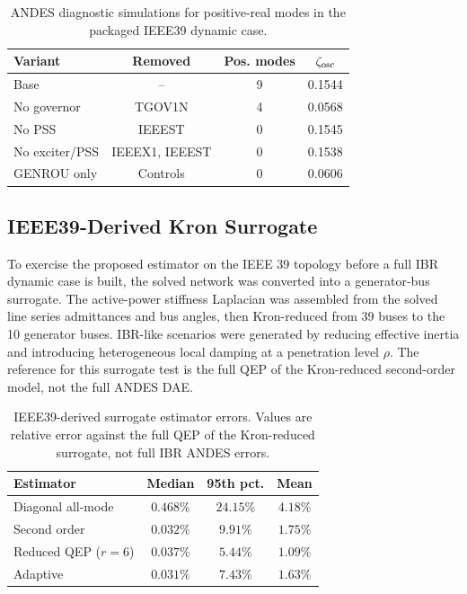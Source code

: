 \documentclass[journal]{IEEEtran}
\begin{document}
\begin{table}[t]
\centering
\caption{ANDES diagnostic simulations for positive-real modes in the packaged IEEE39 dynamic case.}
\label{tab:andesdiagnostic}
\begin{tabular}{lccc}
\toprule
Variant & Removed & Pos. modes & $\zeta_{\rm osc}$\\
\midrule
Base & -- & 9 & 0.1544\\
No governor & TGOV1N & 4 & 0.0568\\
No PSS & IEEEST & 0 & 0.1545\\
No exciter/PSS & IEEEX1, IEEEST & 0 & 0.1538\\
GENROU only & Controls & 0 & 0.0606\\
\bottomrule
\end{tabular}
\end{table}

\subsection{IEEE39-Derived Kron Surrogate}

To exercise the proposed estimator on the IEEE 39 topology before a full IBR dynamic case is built, the solved network was converted into a generator-bus surrogate. The active-power stiffness Laplacian was assembled from the solved line series admittances and bus angles, then Kron-reduced from 39 buses to the 10 generator buses. IBR-like scenarios were generated by reducing effective inertia and introducing heterogeneous local damping at a penetration level $\rho$. The reference for this surrogate test is the full QEP of the Kron-reduced second-order model, not the full ANDES DAE.

\begin{table}[t]
\centering
\caption{IEEE39-derived surrogate estimator errors. Values are relative error against the full QEP of the Kron-reduced surrogate, not full IBR ANDES errors.}
\label{tab:ieee39surrogate}
\begin{tabular}{lccc}
\toprule
Estimator & Median & 95th pct. & Mean\\
\midrule
Diagonal all-mode & $0.468\%$ & $24.15\%$ & $4.18\%$\\
Second order & $0.032\%$ & $9.91\%$ & $1.75\%$\\
Reduced QEP ($r=6$) & $0.037\%$ & $5.44\%$ & $1.09\%$\\
Adaptive & $0.031\%$ & $7.43\%$ & $1.63\%$\\
\bottomrule
\end{tabular}
\end{table}
\end{document}
